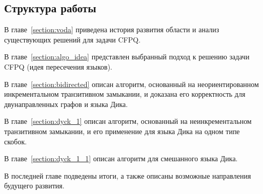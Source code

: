 \subsection*{Структура работы}

В главе~\ref{section:voda} приведена история развития области и анализ существующих решений для задачи CFPQ.

В главе~\ref{section:algo_idea} представлен выбранный подход к решению задачи CFPQ (идея пересечения языков).

В главе~\ref{section:bidirected} описан алгоритм, основанный на неориентированном инкрементальном транзитивном замыкании, и доказана его корректность для двунаправленных графов и языка Дика.

В главе~\ref{section:dyck_1} описан алгоритм, основанный на неинкрементальном транзитивном замыкании, и его применение для языка Дика на одном типе скобок.

В главе~\ref{section:dyck_1_1} описан алгоритм для смешанного языка Дика.

В последней главе подведены итоги, а также описаны возможные направления будущего развития.